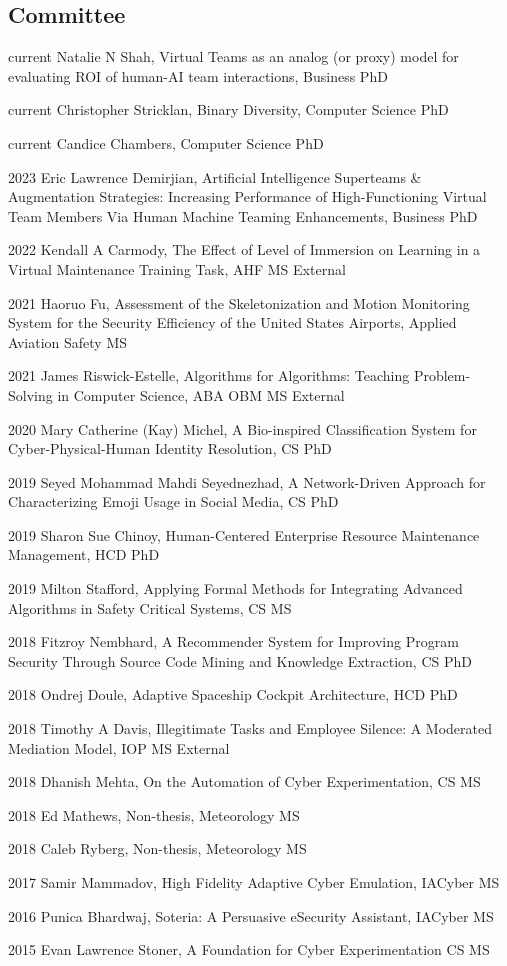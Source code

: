 \documentclass[12pt,letterpaper]{report}
\newcommand{\listitemspace}{0.25em}
\renewenvironment{itemize}
{\begin{list}{}{\setlength{\leftmargin}{0em}
                \setlength{\parskip}{0em}
                \setlength{\itemsep}{\listitemspace}
                \setlength{\parsep}{\listitemspace}}}
{\end{list}}
\begin{document}
    \subsection*{Committee}
    \begin{itemize}
    \item current Natalie N Shah, Virtual Teams as an analog (or proxy) model for evaluating ROI of human-AI team interactions, Business PhD
    \item current Christopher Stricklan, Binary Diversity, Computer Science PhD
    \item current Candice Chambers, Computer Science PhD
    \item  2023 Eric Lawrence Demirjian, Artificial Intelligence Superteams \& Augmentation Strategies: Increasing Performance of High-Functioning Virtual Team Members Via Human Machine Teaming Enhancements, Business PhD
    \item 2022 Kendall A Carmody, The Effect of Level of Immersion on Learning in a Virtual Maintenance Training Task, AHF MS External
    \item 2021 Haoruo Fu, Assessment of the Skeletonization and Motion Monitoring System for the Security Efficiency of the United States Airports, Applied Aviation Safety MS
    \item 2021 James Riswick-Estelle, Algorithms for Algorithms: Teaching Problem-Solving in Computer Science, ABA OBM MS External
    \item 2020 Mary Catherine (Kay) Michel, A Bio-inspired Classification System for Cyber-Physical-Human Identity Resolution, CS PhD
    \item 2019 Seyed Mohammad Mahdi Seyednezhad, A Network-Driven Approach for Characterizing Emoji Usage in Social Media, CS PhD
    \item 2019 Sharon Sue Chinoy, Human-Centered Enterprise Resource Maintenance Management, HCD PhD
    \item 2019 Milton Stafford, Applying Formal Methods for Integrating Advanced Algorithms in Safety Critical Systems, CS MS
    \item 2018 Fitzroy Nembhard, A Recommender System for Improving Program Security Through Source Code Mining and Knowledge Extraction, CS PhD
    \item 2018 Ondrej Doule, Adaptive Spaceship Cockpit Architecture, HCD PhD    
    \item 2018 Timothy A Davis, Illegitimate Tasks and Employee Silence: A Moderated Mediation Model, IOP MS External
    \item 2018 Dhanish Mehta, On the Automation of Cyber Experimentation, CS MS
    \item 2018 Ed Mathews, Non-thesis, Meteorology MS
    \item 2018 Caleb Ryberg, Non-thesis, Meteorology MS
    \item 2017 Samir Mammadov, High Fidelity Adaptive Cyber Emulation, IACyber MS
    \item 2016 Punica Bhardwaj, Soteria: A Persuasive eSecurity Assistant, IACyber MS
    \item 2015 Evan Lawrence Stoner, A Foundation for Cyber Experimentation CS MS


\end{itemize}
\end{document}
